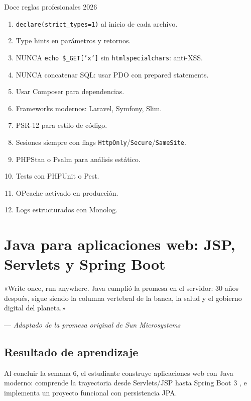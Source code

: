 \documentclass[11pt,a4paper,openany]{book}
\begin{document}
\begin{cajabuenas}{Doce reglas profesionales 2026}
\begin{enumerate}
\item \texttt{declare(strict\_types=1)} al inicio de cada archivo.
\item Type hints en parámetros y retornos.
\item NUNCA \texttt{echo \$\_GET['x']} sin
\texttt{htmlspecialchars}: anti-XSS.
\item NUNCA concatenar SQL: usar PDO con prepared statements.
\item Usar Composer para dependencias.
\item Frameworks modernos: Laravel, Symfony, Slim.
\item PSR-12 para estilo de código.
\item Sesiones siempre con flags
\texttt{HttpOnly}/\texttt{Secure}/\texttt{SameSite}.
\item PHPStan o Psalm para análisis estático.
\item Tests con PHPUnit o Pest.
\item OPcache activado en producción.
\item Logs estructurados con Monolog.
\end{enumerate}
\end{cajabuenas}


\chapter{Java para aplicaciones web: JSP, Servlets y Spring Boot}
\label{cap:semana6}

\epigraph{«Write once, run anywhere. Java cumplió la promesa en el
servidor: 30 años después, sigue siendo la columna vertebral de la
banca, la salud y el gobierno digital del planeta.»}{--- \textit{Adaptado
de la promesa original de Sun Microsystems}}

\section*{Resultado de aprendizaje}
Al concluir la semana 6, el estudiante construye aplicaciones web
con Java moderno: comprende la trayectoria desde Servlets/JSP hasta
Spring Boot 3 \cite{walls2022spring,deitel2017java}, e implementa un
proyecto funcional con persistencia JPA.
\end{document}
